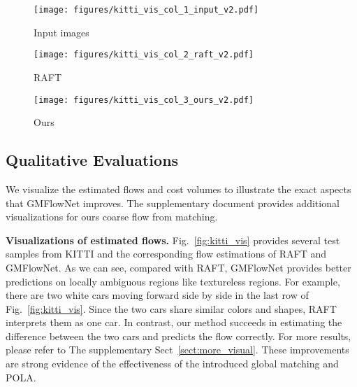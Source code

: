 \documentclass[10pt,twocolumn,letterpaper]{article}
\begin{document}
\begin{figure*}
  \centering
  \begin{subfigure}{0.33\linewidth}
      \texttt{[image: figures/kitti\_vis\_col\_1\_input\_v2.pdf]}
      \caption{Input images}
      \label{fig:kitti_input}
  \end{subfigure}
  \begin{subfigure}{0.33\linewidth}
      \texttt{[image: figures/kitti\_vis\_col\_2\_raft\_v2.pdf]}
      \caption{RAFT\cite{teed2020raft}}
      \label{fig:kitti_raft}
  \end{subfigure}
  \begin{subfigure}{0.33\linewidth}
      \texttt{[image: figures/kitti\_vis\_col\_3\_ours\_v2.pdf]}
      \caption{Ours}
      \label{fig:kitti_outs}
  \end{subfigure}
  \caption{{\bf Qualitative evaluations} for four samples from KITTI test set. (b) Results of the widely adopted optimization-only baseline model RAFT \cite{teed2020raft}. (c) Results of our GMFlowNet. Regions with significant improvements are highlighted by red dash boxes. GMFlowNet works better especially in textureless regions, because our overlapping attention provides more context information to diminish regional ambiguities.} \label{fig:kitti_vis}
\end{figure*}

\subsection{Qualitative Evaluations}

We visualize the estimated flows and cost volumes to illustrate the exact aspects that GMFlowNet improves. The supplementary document provides additional visualizations for ours coarse flow from matching.

{\bf Visualizations of estimated flows.} Fig.~\ref{fig:kitti_vis} provides several test samples from KITTI and the corresponding flow estimations of RAFT and GMFlowNet. As we can see, compared with RAFT, GMFlowNet provides better predictions on locally ambiguous regions like textureless regions. For example, there are two white cars moving forward side by side in the last row of Fig.~\ref{fig:kitti_vis}. Since the two cars share similar colors and shapes, RAFT interprets them as one car. In contrast, our method succeeds in estimating the difference between the two cars and predicts the flow correctly. 
For more results, please refer to The supplementary Sect~\ref{sect:more_visual}.
These improvements are strong evidence of the effectiveness of the introduced global matching and POLA.
\end{document}
